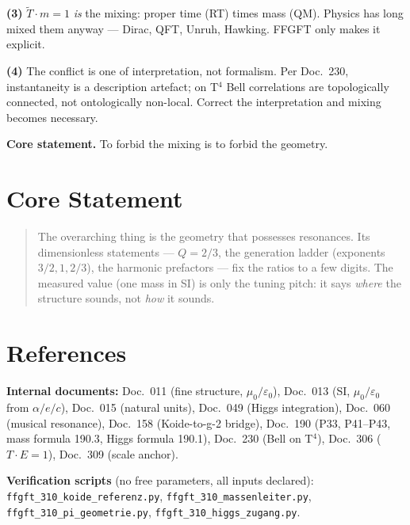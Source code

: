 \textbf{(3)} $\tilde T \cdot m = 1$ \emph{is} the mixing: proper time
(RT) times mass (QM). Physics has long mixed them anyway — Dirac, QFT,
Unruh, Hawking. FFGFT only makes it explicit.

\textbf{(4)} The conflict is one of interpretation, not formalism. Per
Doc.~230, instantaneity is a description artefact; on T$^4$ Bell
correlations are topologically connected, not ontologically non-local.
Correct the interpretation and mixing becomes necessary.

\medskip
\textbf{Core statement.} To forbid the mixing is to forbid the geometry.

\chapter{Core Statement}

\begin{quote}
The overarching thing is the geometry that possesses resonances. Its
dimensionless statements — $Q = 2/3$, the generation ladder (exponents
$3/2, 1, 2/3$), the harmonic prefactors — fix the ratios to a few digits. The measured value (one mass in SI) is only the tuning
pitch: it says \emph{where} the structure sounds, not \emph{how} it
sounds.
\end{quote}

\chapter{References}

\textbf{Internal documents:} Doc.~011 (fine structure, $\mu_0/\varepsilon_0$),
Doc.~013 (SI, $\mu_0/\varepsilon_0$ from $\alpha/e/c$), Doc.~015
(natural units), Doc.~049 (Higgs integration), Doc.~060 (musical
resonance), Doc.~158 (Koide-to-g-2 bridge), Doc.~190 (P33, P41–P43,
mass formula 190.3, Higgs formula 190.1), Doc.~230 (Bell on T$^4$),
Doc.~306 ($T\cdot E = 1$), Doc.~309 (scale anchor).

\medskip
\noindent\textbf{Verification scripts} (no free parameters, all inputs
declared): \texttt{ffgft\_310\_koide\_referenz.py},
\texttt{ffgft\_310\_massenleiter.py},
\texttt{ffgft\_310\_pi\_geometrie.py},
\texttt{ffgft\_310\_higgs\_zugang.py}.
